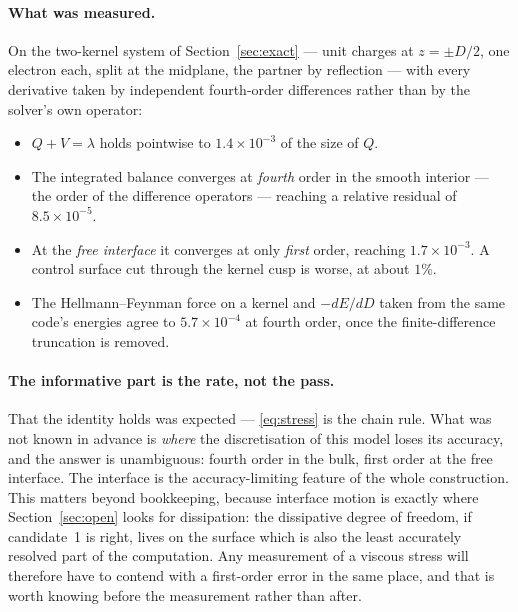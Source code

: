 \documentclass[11pt]{article}
\begin{document}
\paragraph{What was measured.} On the two-kernel system of Section~\ref{sec:exact} --- unit charges
at $z=\pm D/2$, one electron each, split at the midplane, the partner by reflection --- with every
derivative taken by independent fourth-order differences rather than by the solver's own operator:
\begin{itemize}\itemsep2pt
\item $Q+V=\lambda$ holds pointwise to $1.4\times10^{-3}$ of the size of $Q$.
\item The integrated balance converges at \emph{fourth} order in the smooth interior --- the order
of the difference operators --- reaching a relative residual of $8.5\times10^{-5}$.
\item At the \emph{free interface} it converges at only \emph{first} order, reaching
$1.7\times10^{-3}$. A control surface cut through the kernel cusp is worse, at about $1\%$.
\item The Hellmann--Feynman force on a kernel and $-dE/dD$ taken from the same code's energies agree
to $5.7\times10^{-4}$ at fourth order, once the finite-difference truncation is removed.
\end{itemize}

\paragraph{The informative part is the rate, not the pass.} That the identity holds was expected ---
\eqref{eq:stress} is the chain rule. What was not known in advance is \emph{where} the discretisation
of this model loses its accuracy, and the answer is unambiguous: fourth order in the bulk, first
order at the free interface. The interface is the accuracy-limiting feature of the whole
construction. This matters beyond bookkeeping, because interface motion is exactly where
Section~\ref{sec:open} looks for dissipation: the dissipative degree of freedom, if candidate~1 is
right, lives on the surface which is also the least accurately resolved part of the computation. Any
measurement of a viscous stress will therefore have to contend with a first-order error in the same
place, and that is worth knowing before the measurement rather than after.
\end{document}
